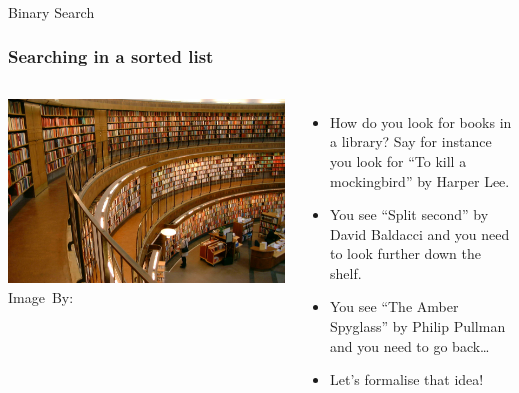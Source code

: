 \begin{frame}[fragile]\frametitle{}
\begin{center}
{\Large Binary Search}
\end{center}

\end{frame}

\begin{frame}
	\frametitle{Searching in a sorted list}
	
	\begin{columns}
	\begin{center}
		\includegraphics[width=0.9\linewidth]{images/library.jpg}\\
		\hspace*{15pt}\hbox{\scriptsize Image By:}
	\end{center}
			\begin{itemize}
			\item How do you look for books in a library? Say for instance you look for ``To kill a mockingbird'' by Harper Lee.
				\item You see ``Split second'' by David Baldacci and you need to look further down the shelf.
					
				\item You see ``The Amber Spyglass'' by Philip Pullman and you need to go back\dots
					
				\item Let's formalise that idea!
			\end{itemize}
	\end{columns}
\end{frame}

